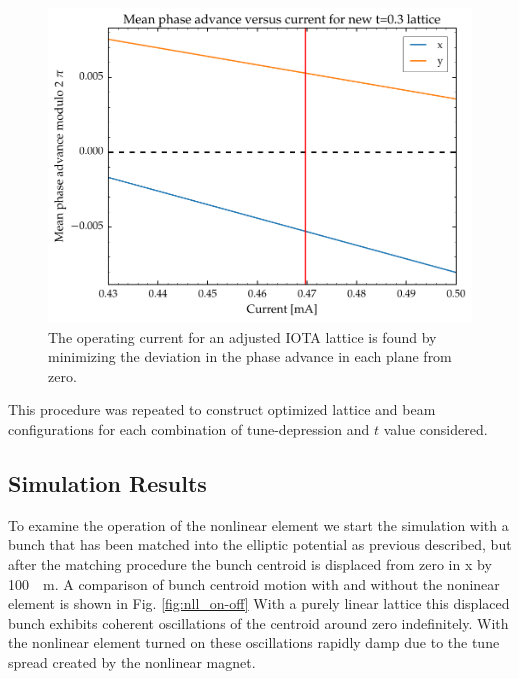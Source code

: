 \documentclass[aps,prstab,twocolumn, groupedaddress]{revtex4-1}
\begin{document}
\begin{figure}
	\includegraphics[width=\columnwidth]{adjusted_t0pt3phase.pdf}%
	\caption{\label{fig:phase_adjust} The operating current for an adjusted IOTA lattice is found by minimizing the deviation in the phase advance in each plane from zero.}
\end{figure}

This procedure was repeated to construct optimized lattice and beam configurations for each combination of tune-depression and $t$ value considered.


\subsection{Simulation Results}
To examine the operation of the nonlinear element we start the simulation with a bunch 
that has been matched into the elliptic potential as previous described, but after the 
matching procedure the bunch centroid is displaced from zero in x by \SI{+100}{\mu m}. A 
comparison of bunch centroid motion with and without the noninear element is shown in 
Fig. \ref{fig:nll_on-off} With a purely linear lattice this displaced bunch exhibits coherent 
oscillations of the centroid around zero indefinitely. With the nonlinear element turned on 
these oscillations  rapidly damp due to the tune spread created by the nonlinear magnet. 
\end{document}
